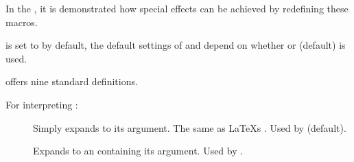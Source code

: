 \documentclass[12pt]{scrartcl}
\let\newslide=\relax
\begin{document}
  In the , it is demonstrated how special effects can be achieved by redefining these macros.

   is set to  by default, the default settings of
   and  depend on whether  or
   (default) is used.

  \newslide

   offers nine standard definitions.

  For interpreting :
  \begin{description}
  \item[]
    Simply expands to its argument. The same as \LaTeX s
    . Used by  (default).

  \item[]
    Expands to an  containing its argument. Used by
    .
  \end{description}

  \newslide
\end{document}
